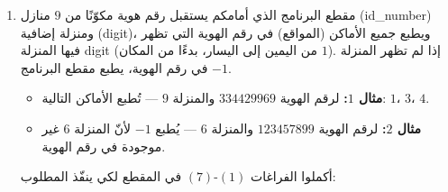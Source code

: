 \documentclass[14pt]{extarticle}
\begin{document}
\begin{enumerate}[label=\textbf{تمرين \arabic*:}, wide=0pt, itemsep=2.2em]
\begin{enumerate}[label=\alph*.]
\item حسب التعريف أعلاه، هل $6$ هو عدد مثالي؟ إذا نعم، اعرضوا تعبيرًا رياضيًا (كما هو معروض في المثال) يُظهر ذلك؛ وإلّا اشرحوا.
\ifwithsols
\begin{boxSolution}
\textbf{نعم}، العدد $6$ هو عدد مثالي لأنّ قواسمه (بدون الـ $6$ نفسه) هي $1$، $2$، $3$، ومجموعها يساوي:
$$6 = 1 + 2 + 3$$
\end{boxSolution}
\else
\\ \underline{\hspace{14cm}}
\fi
\filbreak

\item أمامكم مقطع برنامج يستقبل عددًا من المستخدم ويفحص ما إذا كان العدد مثاليًا. أكملوا الفراغات $(1)$-$(5)$ في المقطع:

\begin{boxCode}
\begin{english}
\begin{verbatim}
num = int(input("Please enter a number:"))
sum = (1)______
x = 1
while x < num:
    if (2)______________:
        sum = sum + (3)_________
    x = (4)_________
if (5)______________:
    print("Perfect number ")
else:
    print("Not perfect number ")
\end{verbatim}
\end{english}
\end{boxCode}

\ifwithsols
\begin{boxSolution}
\begin{enumerate}[label=(\arabic*)]
\item $0$
\item \textenglish{\texttt{num \% x == 0}}
\item $x$
\item $x + 1$
\item \textenglish{\texttt{sum == num}}
\end{enumerate}
\end{boxSolution}
\fi
\filbreak
\end{enumerate}
\filbreak

\item مقطع البرنامج الذي أمامكم يستقبل رقم هوية مكوّنًا من $9$ منازل (\textenglish{id\_number}) ومنزلة إضافية (\textenglish{digit})، ويطبع جميع الأماكن (المواقع) في رقم الهوية التي تظهر فيها المنزلة \textenglish{digit} (من اليمين إلى اليسار، بدءًا من المكان $1$).
إذا لم تظهر المنزلة في رقم الهوية، يطبع مقطع البرنامج $-1$.
\begin{itemize}
\item \textbf{مثال $1$:} لرقم الهوية $334429969$ والمنزلة $9$ — تُطبع الأماكن التالية: $1$، $3$، $4$.
\item \textbf{مثال $2$:} لرقم الهوية $123457899$ والمنزلة $6$ — يُطبع $-1$ لأنّ المنزلة $6$ غير موجودة في رقم الهوية.
\end{itemize}
أكملوا الفراغات $(1)$-$(7)$ في المقطع لكي ينفّذ المطلوب:


\end{enumerate}
\end{document}
